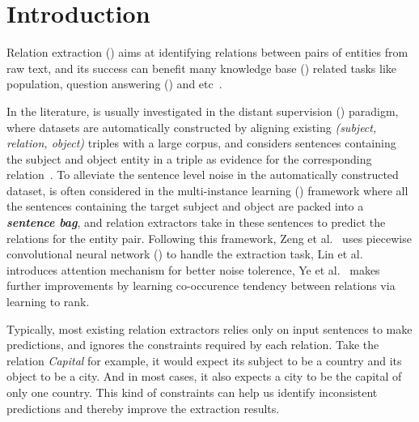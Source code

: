 \section{Introduction}

Relation extraction (\RE) aims at identifying relations between pairs of entities from raw text, and its success can benefit  many knowledge base (\KB) related tasks like \KB population, question answering (\QA) and etc~\cite{suchanek2013advances}.

In the literature, \RE is usually investigated in the distant supervision (\DS) paradigm, where datasets are automatically constructed by aligning existing \KB \emph{(subject, relation, object)} triples with a large corpus, and considers sentences containing the subject and object entity in a triple as evidence for the corresponding relation~\cite{riedel2010modeling}.
To alleviate the sentence level noise in the automatically constructed dataset, \RE is often considered in the multi-instance learning (\MIL) framework where all the sentences containing the target subject and object are packed into a \textbf{\emph{sentence bag}}, and relation extractors take in these sentences to predict the relations for the entity pair. 
Following this framework, Zeng et al.~ uses piecewise convolutional neural network (\PCNN) to handle the extraction task, Lin et al.~ introduces attention mechanism for better noise tolerence,
Ye et al.~ makes further improvements by learning co-occurence tendency between relations via learning to rank.

Typically, most existing relation extractors relies only on input sentences to make predictions, and ignores the constraints required by each relation.
Take the relation \emph{Capital} for example, it would expect its subject to be a country and its object to be a city.
And in most cases, it also expects a city to be the capital of only one country.
This kind of constraints can help us identify inconsistent predictions and thereby improve the extraction results.

